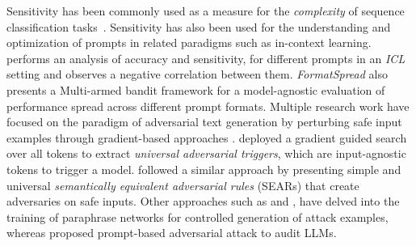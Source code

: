Sensitivity has been commonly used as a measure for the \textit{complexity} of sequence classification tasks~\cite{hahn-etal-2021-sensitivity}. Sensitivity has also been used for the understanding and optimization of prompts in related paradigms such as in-context learning. \citet{lu-etal-2024-prompts} performs an analysis of accuracy and sensitivity, for different prompts in an \textit{ICL} setting and observes a negative correlation between them. \textit{FormatSpread} \cite{sclar2024quantifying} also presents a Multi-armed bandit framework for a model-agnostic evaluation of performance spread across different prompt formats. 
Multiple research work have focused on the paradigm of adversarial text generation by perturbing safe input examples through gradient-based approaches \cite{ebrahimi-etal-2018-hotflip,cheng2020seq2sickevaluatingrobustnesssequencetosequence}. \citet{wallace-etal-2019-universal} deployed a gradient guided search over all tokens to extract \textit{universal adversarial triggers}, which are input-agnostic tokens to trigger a model. \citet{ribeiro-etal-2018-semantically} followed a similar approach by presenting simple and universal \textit{semantically equivalent adversarial rules} (SEARs) that create adversaries on safe inputs. Other approaches such as \citet{iyyer-etal-2018-adversarial} and \citet{roth2024constraintenforcingrewardadversarialattacks}, have delved into the training of paraphrase networks for controlled generation of attack examples, whereas \citet{xu2023llmfoolitselfpromptbased} proposed prompt-based adversarial attack to audit LLMs. 



